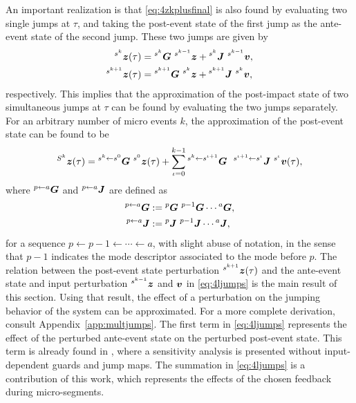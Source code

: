 \documentclass[../DC2017114Bouma.tex]{subfiles}
\begin{document}
An important realization is that \eqref{eq:4zkplusfinal} is also found by evaluating two single jumps at $\tau$, and taking the post-event state of the first jump as the ante-event state of the second jump. These two jumps are given by
\begin{align}
\hspace{0cm}^{s^{k}}{\boldsymbol{z}}(\tau) &= \hspace{0cm}^{s^{k}}{\boldsymbol{G}}\ \hspace{0cm}^{s^{k-1}}{\boldsymbol{z}} + \hspace{0cm}^{s^{k}}{\boldsymbol{J}}\ \hspace{0cm}^{s^{k-1}}{\boldsymbol{v}},\\
\hspace{0cm}^{s^{k+1}}{\boldsymbol{z}}(\tau) &= \hspace{0cm}^{s^{k+1}}{\boldsymbol{G}}\ \hspace{0cm}^{s^{k}}{\boldsymbol{z}} + \hspace{0cm}^{s^{k+1}}{\boldsymbol{J}}\ \hspace{0cm}^{s^{k}}{\boldsymbol{v}},
\end{align}
respectively. This implies that the approximation of the post-impact state of two simultaneous jumps at $\tau$ can be found by evaluating the two jumps separately. For an arbitrary number of micro events $k$, the approximation of the post-event state can be found to be
\begin{align}
\ls^{S^k}\zb(\tau) = \ls^{s^k\leftarrow s^0}\Gb\ \ls^{s^0}\zb(\tau) + \sum_{\iota=0}^{k-1}\ls^{s^{k}\leftarrow s^{\iota+1}}\Gb\ \ ^{s^{\iota+1}\leftarrow s^{\iota}}\Jb\ \ls^{s^{\iota}}\vb(\tau),\label{eq:4ljumps}
\end{align}
where $\hspace{0cm}^{p\leftarrow a}{\boldsymbol{G}}$ and $\hspace{0cm}^{p\leftarrow a}{\boldsymbol{J}}$ are defined as
\begin{align}
\ls^{p\leftarrow a}\Gb &:= \ls^{p}\Gb\ \ls^{p-1}\Gb\cdots\ls^{a}\Gb,\\
\ls^{p\leftarrow a}\Jb &:= \ls^{p}\Jb\ \ls^{p-1}\Jb\cdots\ls^{a}\Jb,
\end{align}
for a sequence $p\leftarrow p-1 \leftarrow \cdots \leftarrow a$, with slight abuse of notation, in the sense that $p-1$ indicates the mode descriptor associated to the mode before $p$. The relation between the post-event state perturbation $\hspace{0cm}^{s^{k+1}}{\boldsymbol{z}}(\tau)$ and the ante-event state and input perturbation $\hspace{0cm}^{s^{k-1}}{\boldsymbol{z}}$ and ${\boldsymbol{v}}$ in \eqref{eq:4ljumps} is the main result of this section. Using that result, the effect of a perturbation on the jumping behavior of the system can be approximated. For a more complete derivation, consult Appendix~\ref{app:multjumps}. The first term in \eqref{eq:4ljumps} represents the effect of the perturbed ante-event state on the perturbed post-event state. This term is already found in \cite{Rijnen2018}, where a sensitivity analysis is presented without input-dependent guards and jump maps. The summation in \eqref{eq:4ljumps} is a contribution of this work, which represents the effects of the chosen feedback during micro-segments.
\end{document}
